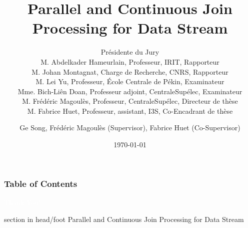 \documentclass{beamer}
\title[Parallel and Continuous Join Processing for Data Stream]{Parallel and Continuous Join Processing for Data Stream}
\subtitle{Présidente du Jury \\
M. Abdelkader Hameurlain, Professeur, IRIT, Rapporteur \\
M. Johan Montagnat, Charge de Recherche, CNRS, Rapporteur \\
M. Lei Yu, Professeur, École Centrale de Pékin, Examinateur \\
Mme. Bich-Liên Doan, Professeur adjoint, CentraleSupélec, Examinateur \\
M. Frédéric Magoulès, Professeur, CentraleSupélec, Directeur de thèse \\
M. Fabrice Huet, Professeur, assistant, I3S, Co-Encadrant de thèse
}
\author[G. Song, F. Magoulès, F. Huet]{
Ge Song, Frédéric Magoulès (Supervisor), Fabrice Huet (Co-Supervisor) }
\institute[CentraleSupélec]{
Lab MICS\\
  CentraleSupélec \\
  Université Paris-Saclay}
\date[\today]{
 \today}
\begin{document}
\begin{frame}
  \titlepage
\end{frame}

\begin{frame}
  \frametitle{Table of Contents}

  \tableofcontents
\end{frame}





%

\begin{frame}[plain, b]
\centering
\huge \textcolor{white}{Thank You!}
\normalsize

\vspace*{\fill}

 \begin{beamercolorbox}[wd=\paperwidth]{section in head/foot}
 \centering
Parallel and Continuous Join Processing for Data Stream
\vskip10pt
\end{beamercolorbox}
 \end{frame}
\end{document}
